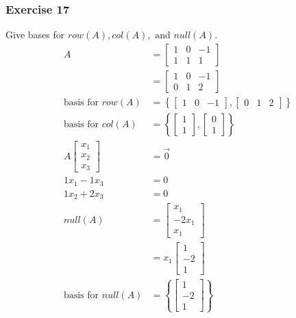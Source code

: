 \documentclass[letterpaper, 12pt]{math}
\begin{document}
\subsubsection*{Exercise 17}
Give bases for \( row(A), col(A), \text{ and } null(A) \).
\begin{align*}
  A &= \begin{bmatrix}1 & 0 & -1 \\ 1 & 1 & 1\end{bmatrix} \\
  &= \begin{bmatrix}1 & 0 & -1 \\ 0 & 1 & 2\end{bmatrix} \\
  \text{basis for } row(A) &= \left\{\begin{bmatrix}
    1 & 0 & -1
  \end{bmatrix},\begin{bmatrix}
    0 & 1 & 2
  \end{bmatrix}\right\} \\
  \text{basis for } col(A) &= \left\{\begin{bmatrix}
    1 \\ 1
  \end{bmatrix},\begin{bmatrix}
    0 \\ 1
  \end{bmatrix}\right\} \\
  A\begin{bmatrix}x_1 \\ x_2 \\ x_3\end{bmatrix} &= \vec{0} \\
  1x_1-1x_3 &= 0 \\
  1x_2+2x_3 &= 0 \\
  null(A) &= \begin{bmatrix}x_1 \\ -2x_1 \\ x_1\end{bmatrix} \\
  &= x_1\begin{bmatrix}1 \\ -2 \\ 1\end{bmatrix} \\
  \text{basis for } null(A) &= \left\{\begin{bmatrix}
    1 \\ -2 \\ 1
  \end{bmatrix}\right\}
\end{align*}
\end{document}
